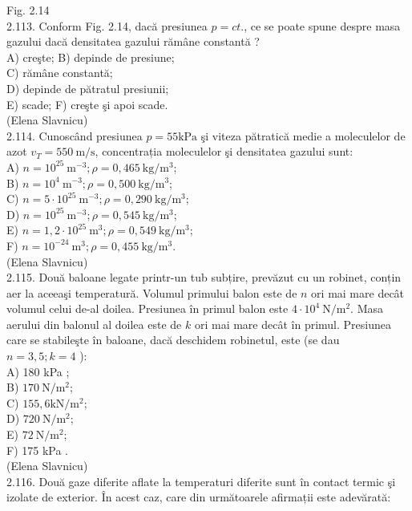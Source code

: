 Fig. 2.14\\
2.113. Conform Fig. 2.14, dacă presiunea $p=c t$., ce se poate spune despre masa gazului dacă densitatea gazului rămâne constantă ?\\
A) creşte; B) depinde de presiune;\\
C) rămâne constantă;\\
D) depinde de pătratul presiunii;\\
E) scade; F) creşte şi apoi scade.\\
(Elena Slavnicu)\\
2.114. Cunoscând presiunea $p=55 \mathrm{kPa}$ şi viteza pătratică medie a moleculelor de azot $v_{T}=550 \mathrm{~m} / \mathrm{s}$, concentrația moleculelor şi densitatea gazului sunt:\\
A) $n=10^{25} \mathrm{~m}^{-3} ; \rho=0,465 \mathrm{~kg} / \mathrm{m}^{3}$;\\
B) $n=10^{4} \mathrm{~m}^{-3} ; \rho=0,500 \mathrm{~kg} / \mathrm{m}^{3}$;\\
C) $n=5 \cdot 10^{25} \mathrm{~m}^{-3} ; \rho=0,290 \mathrm{~kg} / \mathrm{m}^{3}$;\\
D) $n=10^{25} \mathrm{~m}^{-3} ; \rho=0,545 \mathrm{~kg} / \mathrm{m}^{3}$;\\
E) $n=1,2 \cdot 10^{25} \mathrm{~m}^{3} ; \rho=0,549 \mathrm{~kg} / \mathrm{m}^{3}$;\\
F) $n=10^{-24} \mathrm{~m}^{3} ; \rho=0,455 \mathrm{~kg} / \mathrm{m}^{3}$.\\
(Elena Slavnicu)\\
2.115. Două baloane legate printr-un tub subțire, prevăzut cu un robinet, conțin aer la aceeaşi temperatură. Volumul primului balon este de $n$ ori mai mare decât volumul celui de-al doilea. Presiunea în primul balon este $4 \cdot 10^{4} \mathrm{~N} / \mathrm{m}^{2}$. Masa aerului din balonul al doilea este de $k$ ori mai mare decât în primul. Presiunea care se stabileşte în baloane, dacă deschidem robinetul, este (se dau $n=3,5 ; k=4$ ):\\
A) 180 kPa ;\\
B) $170 \mathrm{~N} / \mathrm{m}^{2}$;\\
C) $155,6 \mathrm{kN} / \mathrm{m}^{2}$;\\
D) $720 \mathrm{~N} / \mathrm{m}^{2}$;\\
E) $72 \mathrm{~N} / \mathrm{m}^{2}$;\\
F) 175 kPa .\\
(Elena Slavnicu)\\
2.116. Două gaze diferite aflate la temperaturi diferite sunt în contact termic şi izolate de exterior. În acest caz, care din următoarele afirmații este adevărată:\\
